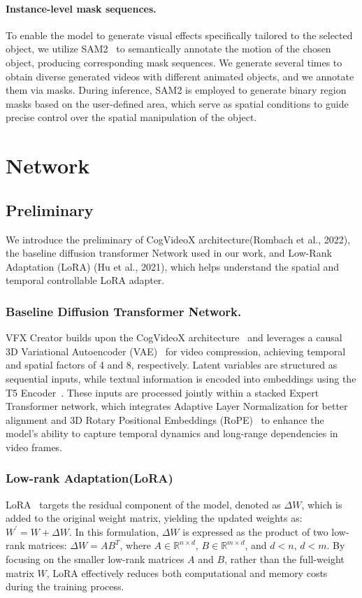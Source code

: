 \paragraph{Instance-level mask sequences.}  To enable the model to generate visual effects specifically tailored to the selected object, we utilize SAM2~\cite{ravi2024sam2segmentimages} to semantically annotate the motion of the chosen object, producing corresponding mask sequences. We generate several times to obtain diverse generated videos with different animated objects, and we annotate them via masks. During inference, SAM2 is employed to generate binary region masks based on the user-defined area, which serve as spatial conditions to guide precise control over the spatial manipulation of the object.

\section{Network}
\subsection{Preliminary}
We introduce the preliminary of CogVideoX architecture(Rombach et al., 2022), the baseline diffusion transformer Network used in our work, and Low-Rank Adaptation (LoRA) (Hu et al., 2021), which helps understand the spatial and temporal controllable LoRA adapter.
\subsubsection{Baseline Diffusion Transformer Network.}
VFX Creator builds upon the CogVideoX architecture~\cite{yang2024cogvideox} and leverages a causal 3D Variational Autoencoder (VAE)~\cite{kingma2013auto} for video compression, achieving temporal and spatial factors of 4 and 8, respectively. Latent variables are structured as sequential inputs, while textual information is encoded into embeddings using the T5 Encoder~\cite{raffel2020exploring}. These inputs are processed jointly within a stacked Expert Transformer network, which integrates Adaptive Layer Normalization for better alignment and 3D Rotary Positional Embeddings (RoPE)~\cite{narvekar2011no} to enhance the model's ability to capture temporal dynamics and long-range dependencies in video frames.
\subsubsection{Low-rank Adaptation(LoRA)}
LoRA~\cite{hu2021lora} targets the residual component of the model, denoted as $\Delta W$, which is added to the original weight matrix, yielding the updated weights as: $W^{\prime}=W+\Delta W$. In this formulation, $\Delta W$ is expressed as the product of two low-rank matrices: $\Delta W=AB^{T}$, where $A\in\mathbb{R}^{n\times d}$, $B\in\mathbb{R}^{m\times d}$, and $d<n$, $d<m$. By focusing on the smaller low-rank matrices $A$ and $B$, rather than the full-weight matrix $W$, LoRA effectively reduces both computational and memory costs during the training process.
